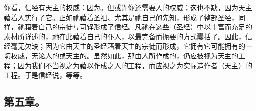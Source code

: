 \par

你看，信经有天主的权威：因为。但或许你还需要人的权威；这也不缺，因为天主藉着人实行了它。正如祂藉着圣祖、尤其是祂自己的先知，形成了整部圣经，同样，祂藉着自己的宗徒与司铎形成了信经。凡祂在这些（圣经）中以丰富而充足的素材所详述的，祂在此藉着自己的仆人，以最完备而扼要的方式囊括了。因此，信经毫无欠缺；因为它由天主的圣经藉着天主的宗徒而形成，它拥有它可能拥有的一切权威，无论人的或天主的。虽然如此，那由人所作成的，仍应被视为天主的工程；因为我们不当视之为藉以作成之人的工程，而应视之为实际造作者（天主）的工程。于是信经说，等等。\par


\subsection{第五章。}

\par

